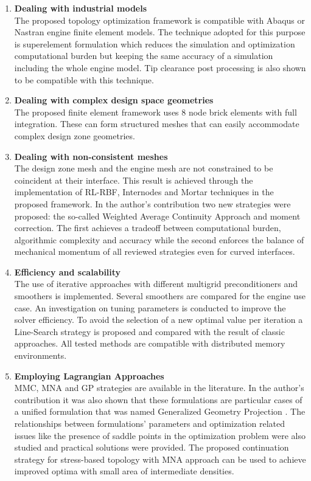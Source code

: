 \begin{enumerate}
	\item \textbf{Dealing with industrial models}\\
	The proposed topology optimization framework is compatible with Abaqus or Nastran engine finite element models. The technique adopted for this purpose is superelement formulation  which reduces the simulation and optimization computational burden but keeping the same accuracy of a simulation including the whole engine model. Tip clearance post processing is also shown to be compatible with this technique.
	\item \textbf{Dealing with complex design space geometries}\\
	The proposed finite element framework uses 8 node brick elements with full integration. These can form structured meshes that can easily accommodate complex design zone geometries. 
	\item \textbf{Dealing with non-consistent meshes}\\
	The design zone mesh and the engine mesh are not constrained to be coincident at their interface. This result is achieved through the implementation of RL-RBF, Internodes and Mortar techniques in the proposed framework. In the author's contribution \cite{coniglio2018weighted} two new strategies were proposed: the so-called Weighted Average Continuity Approach and moment correction. The first achieves a tradeoff between computational burden, algorithmic complexity and accuracy while the second enforces the balance of mechanical momentum of all reviewed strategies even for curved interfaces.
	\item \textbf{Efficiency and scalability}\\
	The use of iterative approaches with different multigrid preconditioners and smoothers is implemented. Several smoothers are compared for the engine use case. An investigation on tuning parameters is conducted to improve the solver efficiency. To avoid the selection of a new optimal value per iteration a Line-Search strategy is proposed and compared with the result of classic approaches.  All tested methods are compatible with distributed memory environments.
	\item \textbf{Employing Lagrangian Approaches}\\
	MMC, MNA and GP strategies are available in the literature.  In the author's contribution it was also shown that these formulations are particular cases of a unified formulation that was named Generalized Geometry Projection \cite{coniglio2019generalized}. The relationships between formulations' parameters and optimization related issues like the presence of saddle points in the optimization problem were also studied and practical solutions were provided. The proposed continuation strategy for stress-based topology with MNA approach can be used to achieve improved optima with small area of intermediate densities. 

\end{enumerate}
